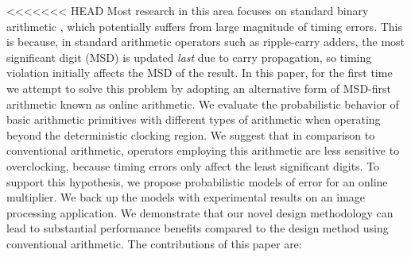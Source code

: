\documentclass{acm_proc_article-sp}
\begin{document}
<<<<<<< HEAD
Most research in this area focuses on standard binary arithmetic \cite{Gupta2013TransCADICS,NonUniformScaling}, which potentially suffers from large magnitude of timing errors. This is because, in standard arithmetic operators such as ripple-carry adders, the most significant digit (MSD) is updated \emph{last} due to carry propagation, so timing violation initially affects the MSD of the result. In this paper, for the first time we attempt to solve this problem by adopting an alternative form of MSD-first arithmetic known as online arithmetic. We evaluate the probabilistic behavior of basic arithmetic primitives with different types of arithmetic when operating beyond the deterministic clocking region. We suggest that in comparison to conventional arithmetic, operators employing this arithmetic are less sensitive to overclocking, because timing errors only affect the least significant digits. To support this hypothesis, we propose probabilistic models of error for an online multiplier. We back up the models with experimental results on an image processing application. We demonstrate that our novel design methodology can lead to substantial performance benefits compared to the design method using conventional arithmetic. The contributions of this paper are:\vspace{-1ex}
\end{document}
